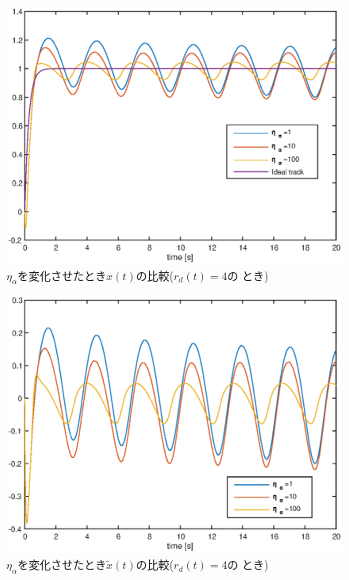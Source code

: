 \documentclass[a4paper,12pt]{jarticle}
\begin{document}
%
\begin{figure}[tb]
    \begin{center}
       \includegraphics[width=140mm]{fig/x_rd4_Etaa.eps}
        \caption{$\eta_\alpha$を変化させたとき$x(t)$の比較($r_d(t)=4$の
	 とき)}
        \label{fig:x_rd4etaa}
    \end{center}
\end{figure}
%
%
\begin{figure}[ht]
    \begin{center}
       \includegraphics[width=140mm]{fig/x_tilde_etaa.eps}
        \caption{$\eta_\alpha$を変化させたとき$\tilde{x}(t)$の比較($r_d(t)=4$の
	 とき)}
        \label{fig:x_tilde_etaa}
    \end{center}
\end{figure}
\end{document}
